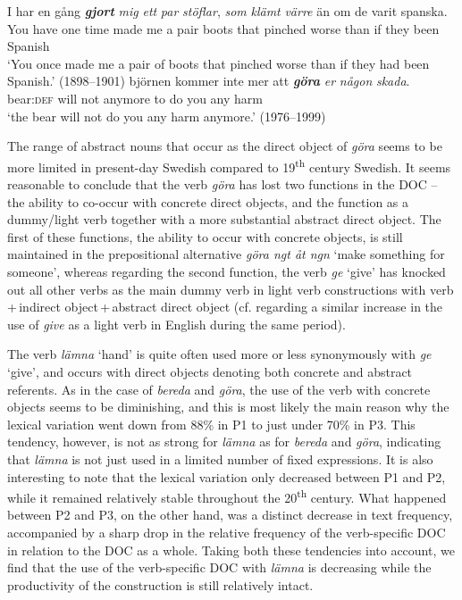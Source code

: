 \documentclass[output=paper]{langscibook}
\begin{document}
\ea \label{ex:valdeson:10}
\gll I       har  en  gång \textbf{\textit{gjort}} \textit{mig}  \textit{ett} \textit{par} \textit{stöflar},  \textit{som}  \textit{klämt}   \textit{värre} än      om  de   varit  spanska.\\
  You    have    one   time  made  me  a    pair  boots    that  pinched worse than    if        they    been  Spanish \\
\glt ‘You once made me a pair of boots that pinched worse than if they had been Spanish.’ (1898–1901)
\ex \label{ex:valdeson:11}
\gll björnen  kommer  inte    mer      att \textbf{\textit{göra}} \textit{er}    \textit{någon}  \textit{skada}.\\
  bear:\textsc{def}         will        not  anymore     to  do      you  any     harm\\
\glt `the bear will not do you any harm anymore.’ (1976–1999)
\z


The range of abstract nouns that occur as the direct object of \textit{göra} seems to be more limited in present-day Swedish compared to 19\textsuperscript{th} century Swedish. It seems reasonable to conclude that the verb \textit{göra} has lost two functions in the DOC – the ability to co-occur with concrete direct objects, and the function as a dummy/light verb together with a more substantial abstract direct object. The first of these functions, the ability to occur with concrete objects, is still maintained in the prepositional alternative \textit{göra ngt åt ngn} ‘make something for someone’, whereas regarding the second function, the verb \textit{ge} ‘give’ has knocked out all other verbs as the main dummy verb in light verb constructions with verb\,+\,indirect object\,+\,abstract direct object (cf. \citealt{Sundquist2020} regarding a similar increase in the use of \textit{give} as a light verb in English during the same period).



\label{sec:valdeson:5.3.1.3}



The verb \textit{lämna} ‘hand’ is quite often used more or less synonymously with \textit{ge} ‘give’, and occurs with direct objects denoting both concrete and abstract referents. As in the case of \textit{bereda} and \textit{göra}, the use of the verb with concrete objects seems to be diminishing, and this is most likely the main reason why the lexical variation went down from 88\% in P1 to just under 70\% in P3. This tendency, however, is not as strong for \textit{lämna} as for \textit{bereda} and \textit{göra}, indicating that \textit{lämna} is not just used in a limited number of fixed expressions. It is also interesting to note that the lexical variation only decreased between P1 and P2, while it remained relatively stable throughout the 20\textsuperscript{th} century. What happened between P2 and P3, on the other hand, was a distinct decrease in text frequency, accompanied by a sharp drop in the relative frequency of the verb-specific DOC in relation to the DOC as a whole. Taking both these tendencies into account, we find that the use of the verb-specific DOC with \textit{lämna} is decreasing while the productivity of the construction is still relatively intact.
\end{document}
